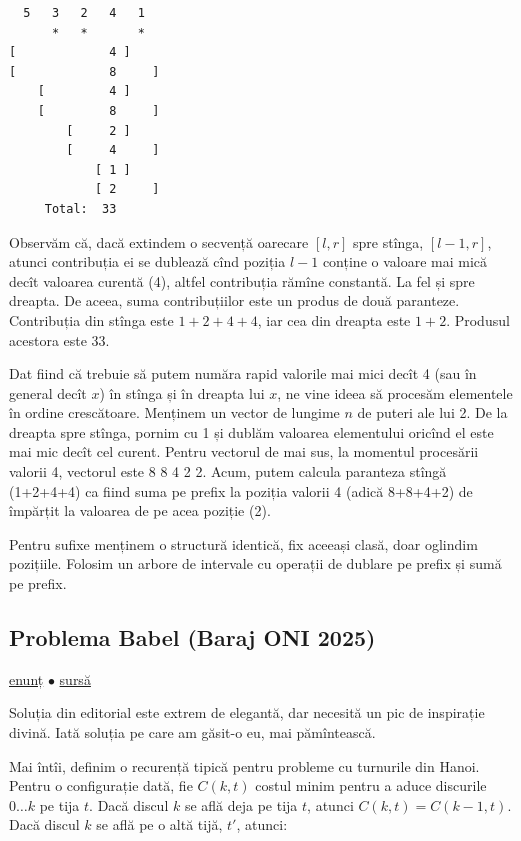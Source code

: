 \documentclass[../main.tex]{subfiles}
\begin{document}
\begin{verbatim}
  5   3   2   4   1
      *   *       *
[             4 ]
[             8     ]
    [         4 ]
    [         8     ]
        [     2 ]
        [     4     ]
            [ 1 ]
            [ 2     ]
     Total:  33
\end{verbatim}

Observăm că, dacă extindem o secvență oarecare $[l,r]$ spre stînga, $[l-1,r]$, atunci contribuția ei se dublează cînd poziția $l-1$ conține o valoare mai mică decît valoarea curentă (4), altfel contribuția rămîne constantă. La fel și spre dreapta. De aceea, suma contribuțiilor este un produs de două paranteze. Contribuția din stînga este $1+2+4+4$, iar cea din dreapta este $1+2$. Produsul acestora este 33.

Dat fiind că trebuie să putem număra rapid valorile mai mici decît 4 (sau în general decît $x$) în stînga și în dreapta lui $x$, ne vine ideea să procesăm elementele în ordine crescătoare. Menținem un vector de lungime $n$ de puteri ale lui 2. De la dreapta spre stînga, pornim cu 1 și dublăm valoarea elementului oricînd el este mai mic decît cel curent. Pentru vectorul de mai sus, la momentul procesării valorii 4, vectorul este 8 8 4 2 2. Acum, putem calcula paranteza stîngă (1+2+4+4) ca fiind suma pe prefix la poziția valorii 4 (adică 8+8+4+2) de împărțit la valoarea de pe acea poziție (2).

Pentru sufixe menținem o structură identică, fix aceeași clasă, doar oglindim pozițiile. Folosim un arbore de intervale cu operații de dublare pe prefix și sumă pe prefix.

\subsection{Problema Babel (Baraj ONI 2025)}
\label{problem:babel}

\href{https://kilonova.ro/problems/3734}{enunț}
$\bullet$
\hyperref[code:babel]{sursă}

Soluția din editorial este extrem de elegantă, dar necesită un pic de inspirație divină. Iată soluția pe care am găsit-o eu, mai pămîntească.

Mai întîi, definim o recurență tipică pentru probleme cu turnurile din Hanoi. Pentru o configurație dată, fie $C(k, t)$ costul minim pentru a aduce discurile $0 \dots k$ pe tija $t$. Dacă discul $k$ se află deja pe tija $t$, atunci $C(k, t) = C(k - 1, t)$. Dacă discul $k$ se află pe o altă tijă, $t'$, atunci:
\end{document}
